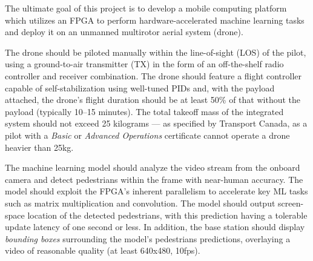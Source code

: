 The ultimate goal of this project is to develop a mobile computing platform which utilizes an FPGA to perform hardware-accelerated machine learning tasks and deploy it on an unmanned multirotor aerial system (drone). 

The drone should be piloted manually within the line-of-sight (LOS) of the pilot, using a ground-to-air transmitter (TX) in the form of an off-the-shelf radio controller and receiver combination. The drone should feature a flight controller capable of self-stabilization using well-tuned PIDs and,
with the payload attached, the drone's flight duration should be at least 50\% of that without the payload (typically 10--15 minutes).
The total takeoff mass of the integrated system should not exceed 25 kilograms --- as specified by Transport Canada, as a pilot with a \textit{Basic} or \textit{Advanced Operations} certificate cannot operate a drone heavier than 25kg.

The machine learning model should analyze the video stream from the onboard camera and detect pedestrians within the frame with near-human accuracy. The model should exploit the FPGA's inherent parallelism to accelerate key ML tasks such as matrix multiplication and convolution. The model should output screen-space location of the detected pedestrians, with this prediction having a tolerable update latency of one second or less. In addition, the base station should display \textit{bounding boxes} surrounding the model's pedestrians predictions, overlaying a video of reasonable quality (at least 640x480, 10fps).
